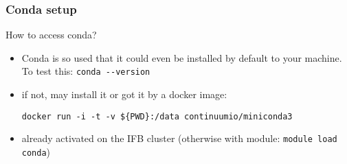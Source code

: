 \begin{frame}[containsverbatim]
\frametitle{Conda setup}
\begin{exampleblock}{How to access conda?}
\begin{itemize}
    \item Conda is so used that it could even be installed by default to your machine. To test this: \verb|conda --version|
    \item if not, may install it or got it by a docker image:
\begin{lstlisting}
docker run -i -t -v ${PWD}:/data continuumio/miniconda3
\end{lstlisting}
   \item already activated on the IFB cluster (otherwise with module: \verb|module load conda|)
\end{itemize} 
\end{exampleblock}
\end{frame}


